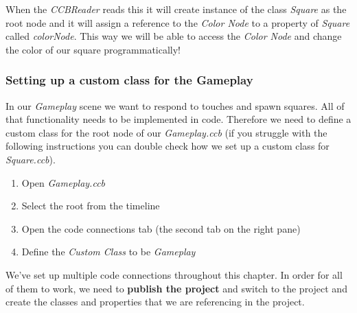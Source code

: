 When the \textit{CCBReader} reads this \ccbfile{} it will create instance of the
class \textit{Square} as the root node and it will assign a reference to the
\textit{Color Node} to a property of \textit{Square} called
\textit{colorNode}. This way we will be able to access the \textit{Color Node}
and change the color of our square programmatically!

\subsubsection{Setting up a custom class for the Gameplay}
In our \textit{Gameplay} scene we want to respond to touches and spawn squares.
All of that functionality needs to be implemented in code. Therefore we need to
define a custom class for the root node of our \textit{Gameplay.ccb} (if you
struggle with the following instructions you can double check how we set up a
custom class for \textit{Square.ccb}).

\begin{leftbar}
\begin{enumerate}
  \item Open \textit{Gameplay.ccb}
  \item Select the root \ccnode{} from the timeline
  \item Open the code connections tab (the second tab on the right pane)
  \item Define the \textit{Custom Class} to be \textit{Gameplay}
\end{enumerate}
\end{leftbar}

We've set up multiple code connections throughout this chapter. In order for all
of them to work, we need to \textbf{publish the \SB{} project} and switch to the
\xcode{} project and create the classes and properties that we are referencing
in the \SB{} project.

